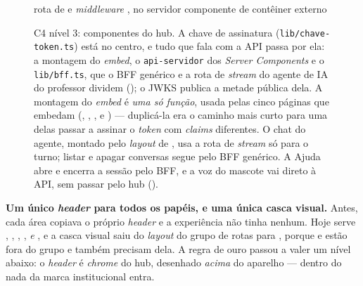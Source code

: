 \begin{figure}[H]
{\begin{tikzpicture}
\end{tikzpicture}}
\begin{legendadiag}
 rota de  e
\emph{middleware} \quad
{} , no servidor \quad
{} componente
de  \quad
{} contêiner externo
\end{legendadiag}
\caption[C4 nível 3 --- componentes do hub]{C4 nível 3: componentes do hub. A
  chave de assinatura (\texttt{lib/chave-token.ts}) está no centro, e tudo que
  fala com a API passa por ela: a montagem do \emph{embed}, o
  \texttt{api-servidor} dos \emph{Server Components} e o \texttt{lib/bff.ts},
  que o BFF genérico e a rota de \emph{stream} do agente de IA do professor
  dividem (); o JWKS publica a metade pública dela. A montagem do
  \emph{embed} é \emph{uma só função}, usada pelas cinco páginas que embedam
  (, , ,
   e ) ---
  duplicá-la era o caminho mais curto para uma delas passar a assinar o
  \emph{token} com \emph{claims} diferentes. O chat do agente, montado pelo
  \emph{layout} de , usa a rota de \emph{stream} só para o
  turno; listar e apagar conversas segue pelo BFF genérico. A Ajuda abre e
  encerra a sessão pelo BFF, e a voz do mascote vai direto à API, sem passar
  pelo hub ().}
\label{fig:c4l3hub}
\end{figure}

\begin{decisao}
\textbf{Um único \emph{header} para todos os papéis, e uma única casca visual.}
Antes, cada área copiava o próprio \emph{header} e a experiência não tinha
nenhum. Hoje  serve , ,
, ,  \emph{e} , e a casca visual saiu do
\emph{layout} do grupo de rotas para , porque  e
 estão fora do grupo e também precisam dela. A regra de ouro
passou a valer um nível abaixo: o \emph{header} é \emph{chrome} do hub, desenhado
\emph{acima} do aparelho --- dentro do  nada da marca institucional
entra.
\end{decisao}

